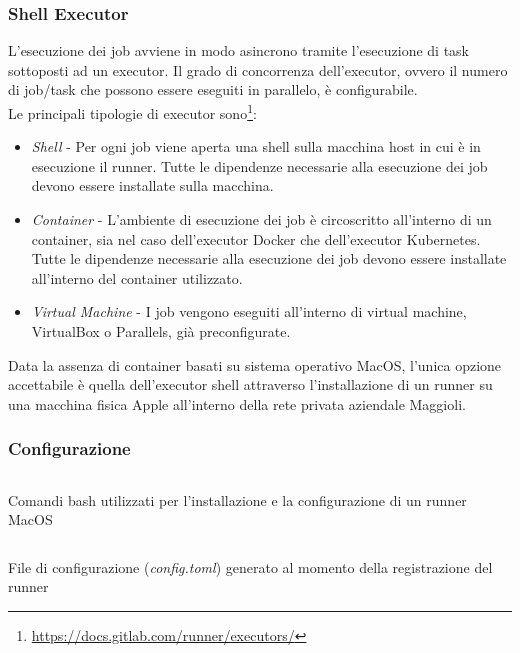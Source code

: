 \subsubsection{Shell Executor}
L'esecuzione dei job avviene in modo asincrono tramite l'esecuzione di task sottoposti ad un executor. Il grado di concorrenza dell'executor, ovvero il numero di job/task che possono essere eseguiti in parallelo, è configurabile.\\
Le principali tipologie di executor sono\footnote{\url{https://docs.gitlab.com/runner/executors/}}:
\begin{itemize}
    \item \textit{Shell} - Per ogni job viene aperta una shell sulla macchina host in cui è in esecuzione il runner. Tutte le dipendenze necessarie alla esecuzione dei job devono essere installate sulla macchina.
    \item \textit{Container} - L'ambiente di esecuzione dei job è circoscritto all'interno di un container, sia nel caso dell'executor Docker che dell'executor Kubernetes. Tutte le dipendenze necessarie alla esecuzione dei job devono essere installate all'interno del container utilizzato.
    \item \textit{Virtual Machine} - I job vengono eseguiti all'interno di virtual machine, VirtualBox o Parallels, già preconfigurate.
\end{itemize}

Data la assenza di container basati su sistema operativo MacOS, l'unica opzione accettabile è quella dell'executor shell attraverso l'installazione di un runner su una macchina fisica Apple all'interno della rete privata aziendale Maggioli.

\subsubsection{Configurazione}

\begin{listing}[H]
\inputminted{bash}{code/4-macos-runner-setup}
\caption{Comandi bash utilizzati per l'installazione e la configurazione di un runner MacOS}
\end{listing}

\begin{listing}[H]
\inputminted{toml}{code/4-macos-runner-config}
\caption{File di configurazione (\textit{config.toml}) generato al momento della registrazione del runner}
\end{listing}

